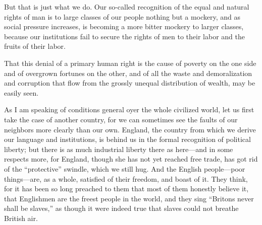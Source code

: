 \documentclass{book}
\begin{document}
But that is just what we do. Our so-called recognition of the equal and natural rights of man is to large classes of our people nothing but a mockery, and as social pressure increases, is becoming a more bitter mockery to larger classes, because our institutions fail to secure the rights of men to their labor and the fruits of their labor.

That this denial of a primary human right is the cause of poverty on the one side and of overgrown fortunes on the other, and of all the waste and demoralization and corruption that flow from the grossly unequal distribution of wealth, may be easily seen.

As I am speaking of conditions general oyer the whole civilized world, let us first take the case of another country, for we can sometimes see the faults of our neighbors more clearly than our own. England, the country from which we derive our language and institutions, is behind us in the formal recognition of political liberty; but there is as much industrial liberty there as here—and in some respects more, for England, though she has not yet reached free trade, has got rid of the “protective” swindle, which we still hug. And the English people—poor things—are, as a whole, satisfied of their freedom, and boast of it. They think, for it has been so long preached to them that most of them honestly believe it, that Englishmen are the freest people in the world, and they sing “Britons never shall be slaves,” as though it were indeed true that slaves could not breathe British air.
\end{document}
